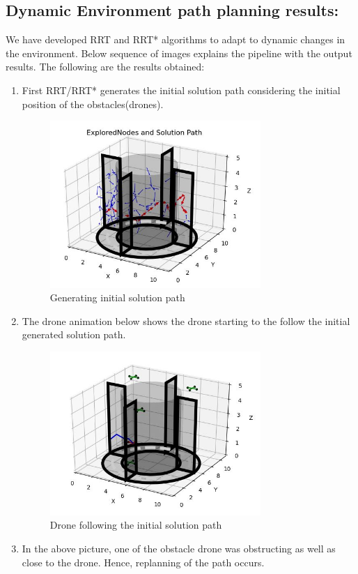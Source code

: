 \documentclass{IEEEtran}
\begin{document}
\subsection{\textbf{Dynamic Environment path planning results:}}
We have developed RRT and RRT* algorithms to adapt to dynamic changes in the environment. Below sequence of images explains the pipeline with the output results. The following are the results obtained:
\begin{enumerate}
\item First RRT/RRT* generates the initial solution path considering the initial position of the obstacles(drones).
\begin{figure}[h]
    \centering
    \includegraphics[width=8cm]{s2}
    \caption{Generating initial solution path}
    \label{fig:Generating initial solution path}
\end{figure}
\item The drone animation below shows the drone starting to the follow the initial generated solution path.
\newpage
\begin{figure}[h]
    \centering
    \includegraphics[width=8cm]{s1}
    \caption{Drone following the initial solution path}
    \label{fig:Drone following the initial solution path}
\end{figure}
\item In the above picture, one of the obstacle drone was obstructing as well as close to the drone. Hence, replanning of the path occurs.

\end{enumerate}
\end{document}
